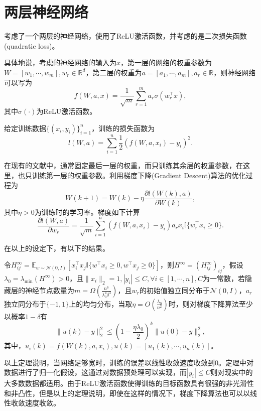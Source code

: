 \section{两层神经网络}
\citet{du2018gradient}考虑了一个两层的神经网络，使用了ReLU激活函数，并考虑的是二次损失函数(quadratic loss)。
\par
具体地说，考虑的神经网络的输入为$x$，第一层的网络的权重参数为$W = [w_1,\cdots, w_m], w_r \in \mathbb{R}^d$，第二层的权重为$a = [a_1,\cdots, a_m], a_r \in \mathbb{R}$，则神经网络可以写为
\begin{equation}
f(W,a,x) = \frac{1}{\sqrt{m}}\sum_{r = 1}^m a_r \sigma(w_r^\top x),
\end{equation}
其中$\sigma(\cdot)$为ReLU激活函数。
\par
给定训练数据$\{(x_i,y_i)\}_{i=1}^n$，训练的损失函数为
\begin{equation}
l(W,a) = \sum_{i=1}^n \frac{1}{2}(f(W,a,x_i)-y_i)^2.
\end{equation}
\par
在现有的文献中，通常固定最后一层的权重，而只训练其余层的权重参数，在这里，也只训练第一层的权重参数。利用梯度下降(Gradient Descent)算法的优化过程为
\begin{equation}
W(k+1) = W(k) - \eta \frac{\partial l(W(k),a)}{\partial W(k)},
\end{equation}
其中$\eta>0$为训练时的学习率。梯度如下计算
\begin{equation}
\frac{\partial l(W,a)}{\partial w_r} = \frac{1}{\sqrt{m}}\sum_{i=1}^n (f(W,a,x_i)-y_i)a_r x_i \mathbb{I}\{w_r^\top x_i \geq 0\}.
\end{equation}
\par
在以上的设定下，有以下的结果。
\begin{theorem}\label{theo:2:1}
令$H^\infty_{ij} = \mathbb{E}_{w\sim \mathcal{N}(0,I)}[x_i^\top x_j \mathbb{I}\{w^\top x_i \geq 0, w^\top x_j \geq 0\}]$，则$H^\infty = (H^\infty_{ij})_{ij}$，假设$\lambda_0 = \lambda_{\min}(H^\infty) > 0$，且$\|x_i\|_2 = 1,|y_i| \leq C, \forall i\in [1,\cdots,n],C$为一常数，若隐藏层的神经节点数量为$m = \Omega(\frac{n^6}{\lambda_0^4\delta^3})$，且$w_r$的初始值独立同分布于$\mathcal{N}(0,I)$，$a_r$独立同分布于$\{-1,1\}$上的均匀分布，当取$\eta = O(\frac{\lambda_0}{n^2})$时，则对梯度下降算法至少以概率$1-\delta$有
\[
\|u(k)-y\|_2^2 \leq (1-\frac{\eta\lambda_0}{2})^k\|u(0)-y\|_2^2,
\]
其中，$u_i(k) = f(W(k),a,x_i), u(k) = [u_1(k),\cdots,u_n(k)]$。
\end{theorem}
\par
以上定理说明，当网络足够宽时，训练的误差以线性收敛速度收敛到0。定理中对数据进行了归一化假设，这通过对数据预处理可以实现，而$|y_i|\leq C$则对现实中的大多数数据都适用。由于ReLU激活函数使得训练的目标函数具有很强的非光滑性和非凸性，但是以上的定理说明，即使在这样的情况下，梯度下降算法也可以以线性收敛速度收敛。


